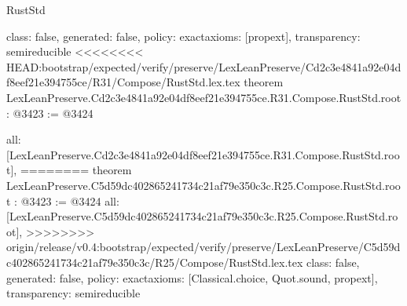 \begin{lexlean}{RustStd}
\begin{coremodule}
{\begin{coremodule}
{{{{  class: false,
  generated: false,
  policy: exact{axioms: [propext]},
  transparency: semireducible
}
<<<<<<<< HEAD:bootstrap/expected/verify/preserve/LexLeanPreserve/Cd2c3e4841a92e04df8eef21e394755ce/R31/Compose/RustStd.lex.tex
theorem LexLeanPreserve.Cd2c3e4841a92e04df8eef21e394755ce.R31.Compose.RustStd.root : @3423 := @3424 {
  all: [LexLeanPreserve.Cd2c3e4841a92e04df8eef21e394755ce.R31.Compose.RustStd.root],
========
theorem LexLeanPreserve.C5d59dc402865241734c21af79e350c3c.R25.Compose.RustStd.root : @3423 := @3424 {
  all: [LexLeanPreserve.C5d59dc402865241734c21af79e350c3c.R25.Compose.RustStd.root],
>>>>>>>> origin/release/v0.4:bootstrap/expected/verify/preserve/LexLeanPreserve/C5d59dc402865241734c21af79e350c3c/R25/Compose/RustStd.lex.tex
  class: false,
  generated: false,
  policy: exact{axioms: [Classical.choice, Quot.sound, propext]},
  transparency: semireducible
}

}}}}
\end{coremodule}}
\end{coremodule}
\end{lexlean}
